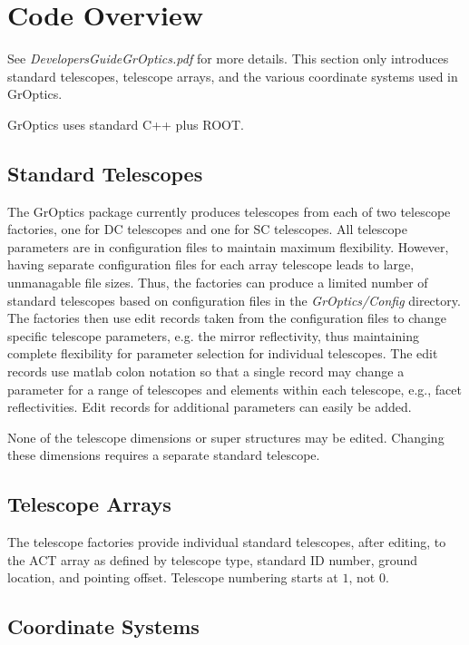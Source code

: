 \documentclass{article}
\begin{document}
\section{Code Overview}\label{S:OVERV}

See \emph{DevelopersGuideGrOptics.pdf} for more details. This section
only introduces standard telescopes, telescope arrays,
and the various coordinate systems used in GrOptics.

GrOptics uses standard C++ plus ROOT.
 
\subsection{Standard Telescopes}\label{SSS:STEL} 

  The GrOptics package currently produces telescopes from each of two
  telescope factories, one for DC telescopes and one for SC telescopes.
  All telescope parameters are in configuration files to maintain maximum
  flexibility.  However, having separate configuration files for each array
  telescope leads to large, unmanagable file sizes. Thus, the factories 
  can produce a limited number of standard telescopes based on configuration
  files in the \emph{GrOptics/Config} directory.  The factories then use
  edit records taken from the configuration files to change specific 
  telescope parameters, e.g. the mirror reflectivity, thus maintaining
  complete flexibility for parameter selection for individual telescopes. 
  The edit
  records use matlab colon notation so that a single record may change a 
  parameter for a range of telescopes and elements within each
  telescope, e.g., facet reflectivities.
  Edit records for additional parameters can easily be added.

  None of the telescope dimensions or super structures may be edited.  
  Changing these dimensions requires a separate standard telescope. 

\subsection{Telescope Arrays}

  The telescope factories provide individual standard telescopes, after
  editing,  to the ACT array
  as defined by telescope type, standard ID number, ground location, and
  pointing offset. Telescope numbering starts at $1$, not $0$.

\subsection{Coordinate Systems}
\end{document}
